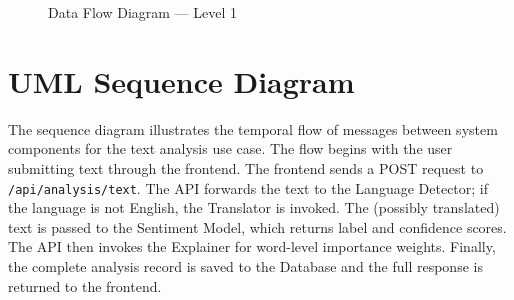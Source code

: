 \documentclass[12pt, a4paper]{report}
\begin{document}
\begin{figure}[H]
{
    }
    \caption{Data Flow Diagram --- Level 1}
    \label{fig:dfd1}
\end{figure}

\section{UML Sequence Diagram}

The sequence diagram illustrates the temporal flow of messages between system components for the text analysis use case. The flow begins with the user submitting text through the frontend. The frontend sends a POST request to \texttt{/api/analysis/text}. The API forwards the text to the Language Detector; if the language is not English, the Translator is invoked. The (possibly translated) text is passed to the Sentiment Model, which returns label and confidence scores. The API then invokes the Explainer for word-level importance weights. Finally, the complete analysis record is saved to the Database and the full response is returned to the frontend.
\end{document}
